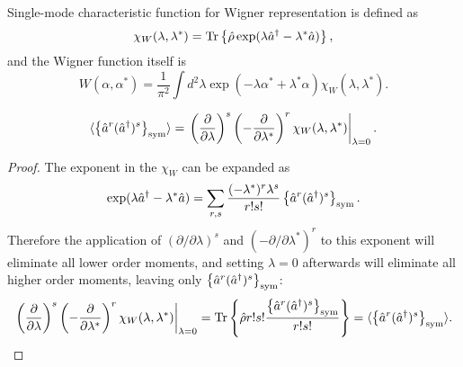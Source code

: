 Single-mode characteristic function for Wigner representation is defined as
\[
	\chi_W (\lambda, \lambda^*)
	= \mathrm{Tr} \left\{  \hat{\rho} \exp (\lambda \hat{a}^\dagger - \lambda^* \hat{a})  \right\},
\]
and the Wigner function itself is
\begin{equation}
\label{eqn:multimode-formalism:single-mode-wigner}
	W (\alpha, \alpha^*)
	= \frac{1}{\pi^2} \int d^2 \lambda \exp(-\lambda \alpha^* + \lambda^* \alpha)
		\chi_W (\lambda, \lambda^*).
\end{equation}

\begin{lemma}
\label{lmm:multimode-formalism:moments-from-chi}
\[
	\langle \left\{  \hat{a}^r (\hat{a}^\dagger)^s  \right\}_{\mathrm{sym}} \rangle
	= \left.
		\left( \frac{\partial}{\partial \lambda} \right)^s
		\left( -\frac{\partial}{\partial \lambda^*} \right)^r
		\chi_W (\lambda, \lambda^*)
	\right|_{\lambda=0}.
\]
\end{lemma}
\begin{proof}
The exponent in the $\chi_W$ can be expanded as
\[
	\exp (\lambda \hat{a}^\dagger - \lambda^* \hat{a})
	= \sum\limits_{r,s}
		\frac{(-\lambda^*)^r \lambda^s}{r!s!}
		\left\{  \hat{a}^r (\hat{a}^\dagger)^s  \right\}_{\mathrm{sym}}.
\]
Therefore the application of $(\partial / \partial \lambda)^s$ and $(-\partial / \partial \lambda^*)^r$ to this exponent will eliminate all lower order moments,
and setting $\lambda = 0$ afterwards will eliminate all higher order moments,
leaving only $\left\{  \hat{a}^r (\hat{a}^\dagger)^s  \right\}_{\mathrm{sym}}$:
\[
	\left.
		\left( \frac{\partial}{\partial \lambda} \right)^s
		\left( -\frac{\partial}{\partial \lambda^*} \right)^r
		\chi_W (\lambda, \lambda^*)
	\right|_{\lambda=0}
	= \mathrm{Tr} \left\{ 
		\hat{\rho} r! s! \frac{\left\{  \hat{a}^r (\hat{a}^\dagger)^s  \right\}_{\mathrm{sym}}}{r! s!}
	 \right\}
	= \langle \left\{  \hat{a}^r (\hat{a}^\dagger)^s  \right\}_{\mathrm{sym}} \rangle.
	\qedhere
\]
\end{proof}

